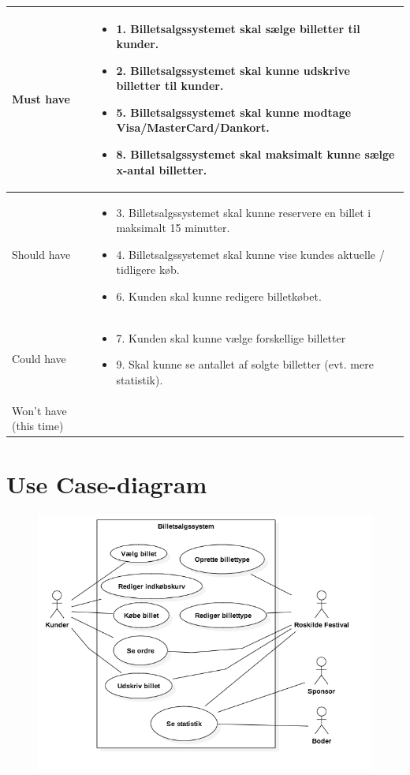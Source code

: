 \begin{tabular}{|p{}|p{}|}
    \hline
    Must have & \begin{itemize}
        \item 1. Billetsalgssystemet skal sælge billetter til kunder.
        \item 2. Billetsalgssystemet skal kunne udskrive billetter til kunder.
        \item 5. Billetsalgssystemet skal kunne modtage Visa/MasterCard/Dankort.
        \item 8. Billetsalgssystemet skal maksimalt kunne sælge x-antal billetter.
    \end{itemize} \\
    \hline
    Should have & \begin{itemize}
        \item 3. Billetsalgssystemet skal kunne reservere en billet i maksimalt 15 minutter.
        \item 4. Billetsalgssystemet skal kunne vise kundes aktuelle / tidligere køb.
        \item 6. Kunden skal kunne redigere billetkøbet.
    \end{itemize} \\
    \hline
    Could have & \begin{itemize}
        \item 7. Kunden skal kunne vælge forskellige billetter
        \item 9. Skal kunne se antallet af solgte billetter (evt. mere statistik).
    \end{itemize} \\
    \hline
    Won't have (this time) & \\
    \hline
\end{tabular}

\section{Use Case-diagram}
\begin{figure}[H]
    \begin{center}
        \includegraphics[width=1\textwidth]{UseCaseDiagram.png}
    \end{center}
\end{figure}

